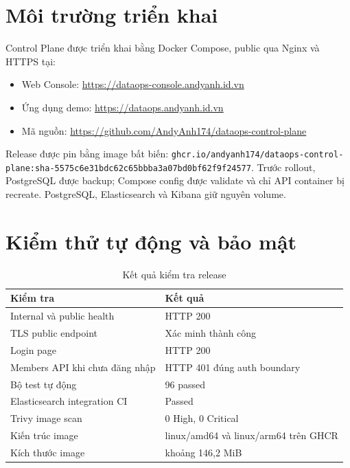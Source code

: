 \documentclass[12pt,a4paper,oneside]{report}
\newcommand{\code}[1]{\texttt{#1}}
\begin{document}
\section{Môi trường triển khai}

Control Plane được triển khai bằng Docker Compose, public qua Nginx và HTTPS tại:

\begin{itemize}
  \item Web Console: \url{https://dataops-console.andyanh.id.vn}
  \item Ứng dụng demo: \url{https://dataops.andyanh.id.vn}
  \item Mã nguồn: \url{https://github.com/AndyAnh174/dataops-control-plane}
\end{itemize}

Release được pin bằng image bất biến:
\code{ghcr.io/andyanh174/dataops-control-plane:sha-5575c6e31bdc62c65bbba3a07bd0bf62f9f24577}.
Trước rollout, PostgreSQL được backup; Compose config được validate và chỉ API container bị
recreate. PostgreSQL, Elasticsearch và Kibana giữ nguyên volume.

\section{Kiểm thử tự động và bảo mật}

\begin{table}[H]
\centering
\caption{Kết quả kiểm tra release}
\label{tab:release-tests}
\begin{tabularx}{\textwidth}{Y C{4.0cm}}
\toprule
\textbf{Kiểm tra} & \textbf{Kết quả} \\
\midrule
Internal và public health & HTTP 200 \\
TLS public endpoint & Xác minh thành công \\
Login page & HTTP 200 \\
Members API khi chưa đăng nhập & HTTP 401 đúng auth boundary \\
Bộ test tự động & 96 passed \\
Elasticsearch integration CI & Passed \\
Trivy image scan & 0 High, 0 Critical \\
Kiến trúc image & linux/amd64 và linux/arm64 trên GHCR \\
Kích thước image & khoảng 146,2 MiB \\
\bottomrule
\end{tabularx}
\end{table}
\end{document}
